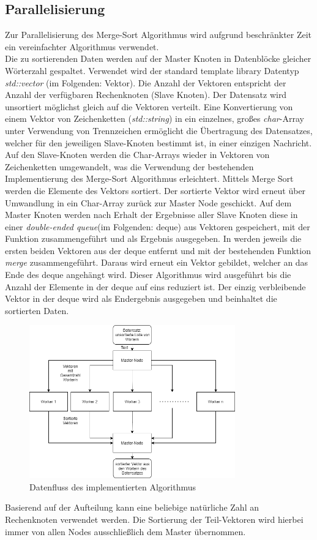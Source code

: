 \subsection{Parallelisierung}
Zur Parallelisierung des Merge-Sort Algorithmus wird aufgrund beschränkter Zeit ein vereinfachter Algorithmus verwendet.\\
Die zu sortierenden Daten werden auf der Master Knoten in Datenblöcke gleicher Wörterzahl gespaltet. Verwendet wird der standard template library Datentyp \textit{std::vector} (im Folgenden: Vektor). Die Anzahl der Vektoren entspricht der Anzahl der verfügbaren Rechenknoten (Slave Knoten). Der Datensatz wird unsortiert möglichst gleich auf die Vektoren verteilt. Eine Konvertierung von einem Vektor von Zeichenketten (\textit{std::string}) in ein einzelnes, großes \textit{char}-Array unter Verwendung von Trennzeichen ermöglicht die Übertragung des Datensatzes, welcher für den jeweiligen Slave-Knoten bestimmt ist, in einer einzigen Nachricht. 
\\
Auf den Slave-Knoten werden die Char-Arrays wieder in Vektoren von Zeichenketten umgewandelt, was die Verwendung der bestehenden Implementierung des Merge-Sort Algorithmus erleichtert. Mittels Merge Sort werden die Elemente des Vektors sortiert. Der sortierte Vektor wird erneut über Umwandlung in ein Char-Array zurück zur Master Node geschickt. Auf dem Master Knoten werden nach Erhalt der Ergebnisse aller Slave Knoten diese in einer \textit{double-ended queue}(im Folgenden: deque) aus Vektoren gespeichert, mit der Funktion  zusammengeführt und als Ergebnis ausgegeben. In   werden jeweils die ersten beiden Vektoren aus der deque entfernt und mit der bestehenden Funktion \textit{merge} zusammengeführt. Daraus wird erneut ein Vektor gebildet, welcher an das Ende des deque angehängt wird. Dieser Algorithmus wird ausgeführt bis die Anzahl der Elemente in der deque auf eins reduziert ist. Der einzig verbleibende Vektor in der deque wird als Endergebnis ausgegeben und beinhaltet die sortierten Daten. 
\\
\begin{figure}[!t]
	\centering
	\includegraphics[width=3.5in]{Parallelisierungs_Algorithmus.png}
	\caption{Datenfluss des implementierten Algorithmus}
	\label{para_algo1}
\end{figure}
Basierend auf der Aufteilung kann eine beliebige natürliche Zahl an Rechenknoten verwendet werden. Die Sortierung der Teil-Vektoren wird hierbei immer von allen Nodes ausschließlich dem Master übernommen.


